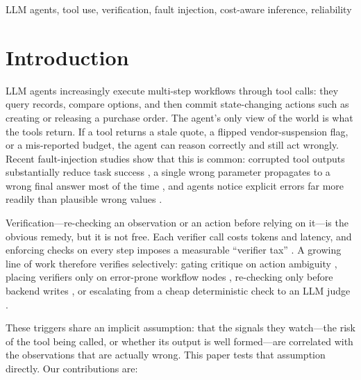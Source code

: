 \documentclass[conference]{IEEEtran}
\begin{document}
\begin{IEEEkeywords}
LLM agents, tool use, verification, fault injection, cost-aware inference, reliability
\end{IEEEkeywords}

\section{Introduction}

LLM agents increasingly execute multi-step workflows through tool calls: they query
records, compare options, and then commit state-changing actions such as creating or
releasing a purchase order. The agent's only view of the world is what the tools return.
If a tool returns a stale quote, a flipped vendor-suspension flag, or a mis-reported budget,
the agent can reason correctly and still act wrongly. Recent fault-injection studies
show that this is common: corrupted tool outputs substantially reduce task success
\cite{gupta2026reliabilitybench,wang2026agentnoisebench,agentchaos2026,zhu2026toolmaze}, a single
wrong parameter propagates to a wrong final answer most of the time \cite{gurram2026agentprop},
and agents notice explicit errors far more readily than plausible wrong values
\cite{kraishan2026loud}.

Verification---re-checking an observation or an action before relying on it---is the
obvious remedy, but it is not free. Each verifier call costs tokens and latency, and
enforcing checks on every step imposes a measurable ``verifier tax''
\cite{sah2026verifiertax}. A growing line of work therefore verifies selectively: gating
critique on action ambiguity \cite{park2026sag}, placing verifiers only on error-prone
workflow nodes \cite{ro2025sherlock}, re-checking only before backend writes
\cite{chen2026reconsider}, or escalating from a cheap deterministic check to an LLM judge
\cite{sieve2025,safeharness2026,verificationlayer2026}.

These triggers share an implicit assumption: that the signals they watch---the risk of the
tool being called, or whether its output is well formed---are correlated with the
observations that are actually wrong. This paper tests that assumption directly. Our
contributions are:
\end{document}
